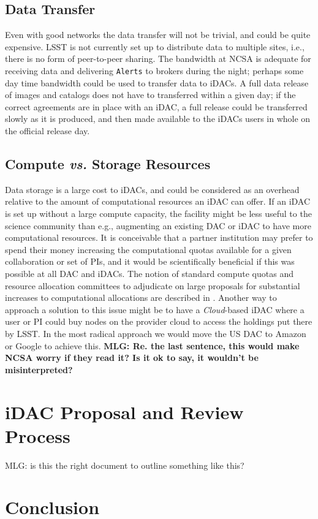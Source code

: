 \subsection{Data Transfer}
Even with good networks the data transfer will not be trivial, and could be quite expensive. LSST is not currently set up to distribute data to multiple sites, i.e., there is no form of peer-to-peer sharing. The bandwidth at NCSA is adequate for receiving data and delivering {\tt Alerts} to brokers during the night; perhaps some day time bandwidth could be used to transfer data to iDACs. A full data release of images and catalogs does not have to transferred within a given day; if the correct agreements are in place with an iDAC, a full release could be transferred slowly as it is produced, and then made available to the iDACs users in whole on the official release day.

\subsection{Compute {\it vs.} Storage Resources}
Data storage is a large cost to iDACs, and could be considered as an overhead relative to the amount of computational resources an iDAC can offer. If an iDAC is set up without a large compute capacity, the facility might be less useful to the science community than e.g., augmenting an existing DAC or iDAC to have more computational resources. It is conceivable that a partner institution may prefer to spend their money increasing the computational quotas available for a given collaboration or set of PIs, and it would be scientifically beneficial if this was possible at all DAC and iDACs. The notion of standard compute quotas and resource allocation committees to adjudicate on large proposals for substantial increases to computational allocations are described in . Another way to approach a solution to this issue might be to have a \emph{Cloud}-based iDAC where a user or PI could buy nodes on the provider cloud to access the holdings put there by LSST. In the most radical approach we would move the US DAC to Amazon or Google to achieve this. {\bf MLG: Re. the last sentence, this would make NCSA worry if they read it? Is it ok to say, it wouldn't be misinterpreted?}

\section{iDAC Proposal and Review Process}

{MLG: is this the right document to outline something like this?}

\section{Conclusion}
